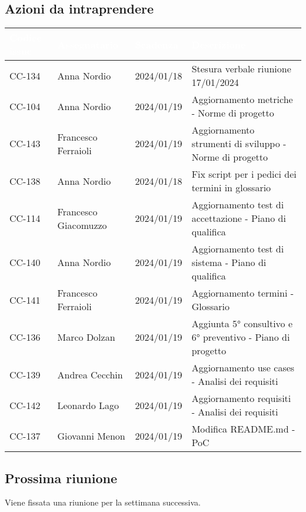 \subsection{Azioni da intraprendere}
{
    \setlength{\tabcolsep}{10pt}
            \renewcommand{\arraystretch}{1.5}
            \begin{xltabular}{\textwidth}{| l | l | l | X |}
                 \hline
                 \textbf{\textcolor{white}{Codice issue}} & \textbf{\textcolor{white}{Assegnatario}} & \textbf{\textcolor{white}{Scadenza}} & \textbf{\textcolor{white}{Descrizione}} \\
                 \hline
                 CC-134 & Anna Nordio & 2024/01/18 & Stesura verbale riunione 17/01/2024 \\
                 \hline
                 CC-104 & Anna Nordio & 2024/01/19 & Aggiornamento metriche - Norme di progetto\\
                 \hline
                 CC-143 & Francesco Ferraioli & 2024/01/19 & Aggiornamento strumenti di sviluppo - Norme di progetto\\
                 \hline
                 CC-138 & Anna Nordio & 2024/01/18 & Fix script per i pedici dei termini in glossario \\
                 \hline
                 CC-114 & Francesco Giacomuzzo & 2024/01/19 & Aggiornamento test di accettazione - Piano di qualifica \\
                 \hline
                 CC-140 & Anna Nordio & 2024/01/19 & Aggiornamento test di sistema - Piano di qualifica \\
                 \hline
                 CC-141 & Francesco Ferraioli & 2024/01/19 & Aggiornamento termini - Glossario \\
                 \hline
                 CC-136 & Marco Dolzan & 2024/01/19 & Aggiunta 5° consultivo e 6° preventivo - Piano di progetto \\
                 \hline
                 CC-139 & Andrea Cecchin & 2024/01/19 & Aggiornamento use cases - Analisi dei requisiti \\
                 \hline
                 CC-142 & Leonardo Lago & 2024/01/19 & Aggiornamento requisiti - Analisi dei requisiti \\
                 \hline
                 CC-137 & Giovanni Menon & 2024/01/19 & Modifica README.md - PoC \\
                 \hline
            \end{xltabular}
}


\subsection{Prossima riunione} \label{subsec:riunione}
Viene fissata una riunione per la settimana successiva.